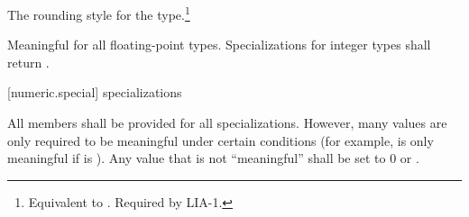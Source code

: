 \begin{itemdescr}
\pnum
The rounding style for the type.\footnote{Equivalent to .
Required by LIA-1.}

\pnum
Meaningful for all floating-point types.
Specializations for integer types shall return
.
\end{itemdescr}

[numeric.special]{ specializations}

\pnum
All members shall be provided for all specializations.
However, many values are only required to be meaningful under certain
conditions
(for example,
is only meaningful if
is
).
Any value that is not ``meaningful'' shall be set to 0 or
.

